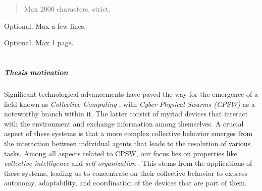 \documentclass[12pt,a4paper,openright,twoside]{book}
\begin{document}
	
\frontmatter



\begin{abstract}	
Max 2000 characters, strict.
\end{abstract}

\begin{dedication} 
Optional. Max a few lines.
\end{dedication}

\begin{acknowledgements}
Optional. Max 1 page.
\end{acknowledgements}

\tableofcontents   
\listoffigures     
\lstlistoflistings 

\mainmatter

\chapter{\introductionname}
\label{chap:introduction}


\paragraph{Thesis motivation} %

Significant technological advancements have paved the way for the emergence of a field known as \emph{Collective Computing} 
    \cite{abowd2016beyond}, with \emph{Cyber-Physical Swarms (CPSW)} \cite{schranz2021swarm} as a noteworthy branch within it.
    The latter consist of myriad devices that interact with the environment and exchange information among themselves. 
    A crucial aspect of these systems is that a more complex collective behavior emerges from the interaction between 
    individual agents that leads to the resolution of various tasks.
    Among all aspects related to CPSW, our focus lies on properties like \emph{collective intelligence} \cite{tumer2004survey} 
    and \emph{self-organization} \cite{schmeck2011organic}. This stems from the applications of these systems, leading us to 
    concentrate on their collective behavior to express autonomy, adaptability, and coordination of the devices 
    that are part of them.
\end{document}

